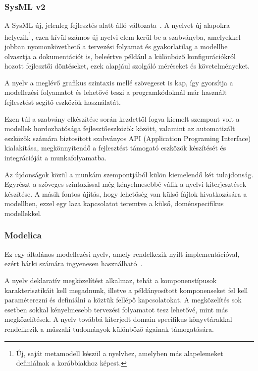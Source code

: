         \subsubsection{SysML v2}
        A SysML új, jelenleg fejlesztés alatt álló változata~\cite{Bajaj_2022}. A nyelvet új alapokra helyezik\footnote{Új, saját metamodell készül a nyelvhez, amelyben más alapelemeket definiálnak a korábbiakhoz képest.},
        ezen kívül számos új nyelvi elem kerül be a szabványba, amelyekkel jobban nyomonkövethető a tervezési folyamat és
        gyakorlatilag a modellbe olvasztja a dokumentációt is, beleértve például a különböző konfigurációkról
        hozott fejlesztői döntéseket, ezek alapjául szolgáló méréseket és követelményeket.
        
        A nyelv a meglévő grafikus szintaxis mellé szövegeset is kap, így gyorsítja a modellezési folyamatot és lehetővé teszi a programkódoknál már használt fejlesztést segítő eszközök használatát.

        Ezen túl a szabvány elkészítése során kezdettől fogva kiemelt szempont volt a modellek hordozhatósága fejlesztőeszközök között, valamint az automatizált eszközök számára biztosított szabványos API (Application Programing Interface) kialakítása, megkönnyítendő a fejlesztést támogató eszközök készítését és integrációját a munkafolyamatba.
        
        Az újdonságok közül a munkám szempontjából külön kiemelendő két tulajdonság.
        Egyrészt a szöveges szintaxissal még kényelmesebbé válik a nyelvi
        kiterjesztések készítése.
        A másik fontos újítás, hogy lehetőség van külső fájlok hivatkozására a modellben, ezzel egy laza kapcsolatot teremtve a külső, doménspecifikus modellekkel.

        \subsubsection{Modelica}
        Ez egy általános modellezési nyelv, amely rendelkezik nyílt implementációval, ezért bárki számára
        ingyenesen használható~\cite{Modelica2023}.
        
        A nyelv deklaratív megközelítést alkalmaz, tehát a komponenstípusok
        karakterisztikáit kell megadnunk, illetve a példányosított komponenseket fel kell paraméterezni és
        definiálni a köztük fellépő kapcsolatokat. A megközelítés sok esetben sokkal kényelmesebb tervezési folyamatot
        tesz lehetővé, mint más megközelítések. A nyelv továbbá kiterjedt domain specifikus könyvtárakkal
        rendelkezik a műszaki tudományok különböző ágainak támogatására.

